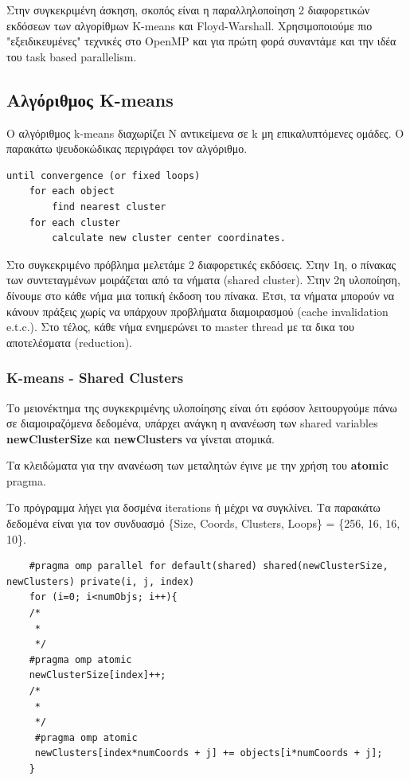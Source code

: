 \documentclass[../final_report.tex]{subfiles}
\begin{document}
Στην συγκεκριμένη άσκηση, σκοπός είναι η παραλληλοποίηση 2 διαφορετικών εκδόσεων των αλγορίθμων K-means και Floyd-Warshall.
Χρησιμοποιούμε πιο "εξειδικευμένες" τεχνικές στο OpenMP και για πρώτη φορά συναντάμε και την ιδέα του task based parallelism.


\subsection{Αλγόριθμος K-means}

Ο αλγόριθμος k-means διαχωρίζει N αντικείμενα σε k μη επικαλυπτόμενες ομάδες. Ο παρακάτω ψευδοκώδικας περιγράφει τον αλγόριθμο.

\begin{lstlisting}
until convergence (or fixed loops)
    for each object
        find nearest cluster
    for each cluster
        calculate new cluster center coordinates.
\end{lstlisting}

Στο συγκεκριμένο πρόβλημα μελετάμε 2 διαφορετικές εκδόσεις. Στην 1η, ο πίνακας των συντεταγμένων μοιράζεται από τα νήματα (shared cluster).
Στην 2η υλοποίηση, δίνουμε στο κάθε νήμα μια τοπική έκδοση του πίνακα. Έτσι, τα νήματα μπορούν να κάνουν πράξεις
χωρίς να υπάρχουν προβλήματα διαμοιρασμού (cache invalidation e.t.c.). Στο τέλος, κάθε νήμα ενημερώνει το
master thread με τα δικα του αποτελέσματα (reduction).

\subsubsection{K-means - Shared Clusters}

Το μειονέκτημα της συγκεκριμένης υλοποίησης είναι ότι εφόσον λειτουργούμε πάνω σε διαμοιραζόμενα δεδομένα, υπάρχει
ανάγκη η ανανέωση των shared variables \textbf{newClusterSize} και \textbf{newClusters} να γίνεται ατομικά.

Τα κλειδώματα για την ανανέωση των μεταλητών έγινε με την χρήση του \textbf{atomic} pragma.

Το πρόγραμμα λήγει για δοσμένα iterations ή μέχρι να συγκλίνει. Τα παρακάτω δεδομένα είναι για τον συνδυασμό
\{Size, Coords, Clusters, Loops\} = \{256, 16, 16, 10\}.

\begin{lstlisting}
    #pragma omp parallel for default(shared) shared(newClusterSize, newClusters) private(i, j, index)
    for (i=0; i<numObjs; i++){
    /*
     *
     */
    #pragma omp atomic
    newClusterSize[index]++;
    /*
     *
     */
     #pragma omp atomic
     newClusters[index*numCoords + j] += objects[i*numCoords + j];
    }
\end{lstlisting}
\end{document}
